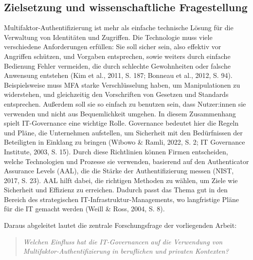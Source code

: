 \subsection{Zielsetzung und wissenschaftliche Fragestellung}
Multifaktor-Authentifizierung ist mehr als einfache technische Lösung für die Verwaltung von Identitäten und Zugriffen.
Die Technologie muss viele verschiedene Anforderungen erfüllen: Sie soll sicher sein, also effektiv vor Angriffen schützen, und Vorgaben entsprechen, sowie weiters durch einfache Bedienung Fehler vermeiden, die durch schlechte Gewohnheiten oder falsche Anwensung entstehen (Kim et al., 2011, S. 187; Bonneau et al., 2012, S. 94).
Beispielsweise muss MFA starke Verschlüsselung haben, um Manipulationen zu widerstehen, und gleichzeitig den Vorschriften von Gesetzen und Standards entsprechen.
Außerdem soll sie so einfach zu benutzen sein, dass Nutzer:innen sie verwenden und nicht aus Bequemlichkeit umgehen.
In diesem Zusammenhang spielt IT-Governance eine wichtige Rolle. Governance bedeutet hier die Regeln und Pläne, die Unternehmen aufstellen, um Sicherheit mit den Bedürfnissen der Beteiligten in Einklang zu bringen (Wibowo & Ramli, 2022, S. 2; IT Governance Institute, 2003, S. 15).
Durch diese Richtlinien können Firmen entscheiden, welche Technologien und Prozesse sie verwenden, basierend auf den Authenticator Assurance Levels (AAL), die die Stärke der Authentifizierung messen (NIST, 2017, S. 23).
AAL hilft dabei, die richtigen Methoden zu wählen, um Ziele wie Sicherheit und Effizienz zu erreichen.
Dadurch passt das Thema gut in den Bereich des strategischen IT-Infrastruktur-Managements, wo langfristige Pläne für die IT gemacht werden (Weill & Ross, 2004, S. 8).

Daraus abgeleitet lautet die zentrale Forschungsfrage der vorliegenden Arbeit:
\begin{quote}
\textit{Welchen Einfluss hat die IT-Governancen auf die Verwendung von Multifaktor-Authentifizierung in beruflichen und privaten Kontexten?}
\end{quote}

